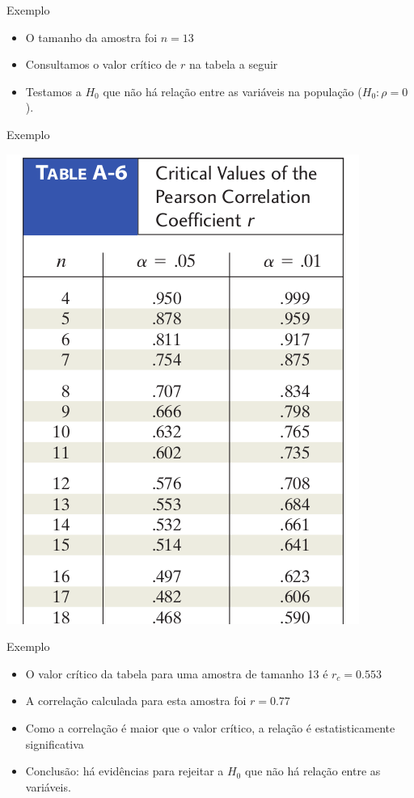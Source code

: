 \documentclass{beamer}
\begin{document}
\begin{frame}{Exemplo}
  \begin{itemize}
  \item O tamanho da amostra foi $n=13$
  \item Consultamos o valor crítico de $r$ na tabela a seguir
  \item Testamos a $H_0$ que não há relação entre as variáveis na
    população ($H_0: \rho = 0$).
  \end{itemize}
\end{frame}

\begin{frame}{Exemplo}
  \begin{center}
      \includegraphics[height=0.8\textheight]{test}
  \end{center}
\end{frame}

\begin{frame}{Exemplo}
  \begin{itemize}
  \item O valor crítico da tabela para uma amostra de tamanho 13 é
    $r_c = 0.553$
  \item A correlação calculada para esta amostra foi $r=0.77$
  \item Como a correlação é maior que o valor crítico, a relação é
    estatisticamente significativa
  \item Conclusão: há evidências para rejeitar a $H_0$ que não há
    relação entre as variáveis.
  \end{itemize}
\end{frame}
\end{document}
